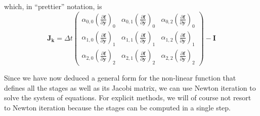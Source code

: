 \documentclass[10pt,a4paper]{article}
\newcommand{\bvec}[1]{\mathbf{#1}}
\begin{document}
which, in ``prettier'' notation, is
\begin{equation*}
  \bvec{J}_\bvec{k} = \Delta t \begin{pmatrix}
    \alpha_{0,0}\left( \frac{\partial \bvec{f}}{\partial \bvec{y}} \right)_0 & \alpha_{0,1}\left( \frac{\partial \bvec{f}}{\partial \bvec{y}} \right)_0 & \alpha_{0,2}\left( \frac{\partial \bvec{f}}{\partial \bvec{y}} \right)_0 \\
    \alpha_{1,0}\left( \frac{\partial \bvec{f}}{\partial \bvec{y}} \right)_1 & \alpha_{1,1}\left( \frac{\partial \bvec{f}}{\partial \bvec{y}} \right)_1 & \alpha_{1,2}\left( \frac{\partial \bvec{f}}{\partial \bvec{y}} \right)_1 \\
    \alpha_{2,0}\left( \frac{\partial \bvec{f}}{\partial \bvec{y}} \right)_2 & \alpha_{2,1}\left( \frac{\partial \bvec{f}}{\partial \bvec{y}} \right)_2 & \alpha_{2,2}\left( \frac{\partial \bvec{f}}{\partial \bvec{y}} \right)_2
  \end{pmatrix} - \bvec{I}
\end{equation*}

Since we have now deduced a general form for the non-linear function that defines all the stages as well as its Jacobi matrix, we can use Newton iteration to solve the system of equations.
For explicit methods, we will of course not resort to Newton iteration because the stages can be computed in a single step.
\end{document}
